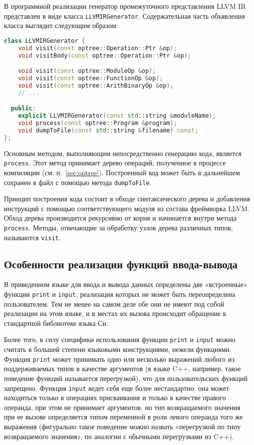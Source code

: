 В программной реализации генератор промежуточного представления LLVM IR представлен в виде класса \verb|LLVMIRGenerator|.
Содержательная часть объявления класса выглядит следующим образом:

\begin{lstlisting}[language=C++, caption=Объявление класса LLVMIRGenerator]
class LLVMIRGenerator {
    void visit(const optree::Operation::Ptr &op);
    void visitBody(const optree::Operation::Ptr &op);

    void visit(const optree::ModuleOp &op);
    void visit(const optree::FunctionOp &op);
    void visit(const optree::ArithBinaryOp &op);
    // ...

  public:
    explicit LLVMIRGenerator(const std::string &moduleName);
    void process(const optree::Program &program);
    void dumpToFile(const std::string &filename) const;
};
\end{lstlisting}

Основным методом, выполняющим непосредственно генерацию кода, является \verb|process|.
Этот метод принимает дерево операций, полученное в процессе компиляции (см. п.~\ref{sec:optree}).
Построенный код может быть в дальнейшем сохранен в файл с помощью метода \verb|dumpToFile|.

Принцип построения кода состоит в обходе синтаксического дерева и добавления инструкций с помощью соответствующего модуля из состава фреймворка LLVM.
Обход дерева производится рекурсивно от корня и начинается внутри метода \verb|process|.
Методы, отвечающие за обработку узлов дерева различных типов, называются \verb|visit|.


\subsection{Особенности реализации функций ввода-вывода}

В приведенном языке для ввода и вывода данных определены две «встроенные» функции \verb|print| и \verb|input|, реализация которых не может быть переопределена пользователем.
Тем не менее на самом деле обе они не имеют под собой реализации на этом языке, и в местах их вызова происходит обращение к стандартной библиотеке языка Си.

Более того, в силу специфики использования функции \verb|print| и \verb|input| можно считать в большей степени языковыми конструкциями, нежели функциями.
Функция \verb|print| может принимать одно или несколько выражений любого из поддерживаемых типов в качестве аргументов (в языке C++, например, такое поведение функций называется перегрузкой), что для пользовательских функций запрещено.
Функция \verb|input| ведет себя еще более нестандартно: она может находиться только в операциях присваивания и только в качестве правого операнда, при этом не принимает аргументов, но тип возвращаемого значения при ее вызове определяется типом переменной в роли левого операнда того же выражения (фигурально такое поведение можно назвать «перегрузкой по типу возвращаемого значения», по аналогии с обычными перегрузками из C++).

